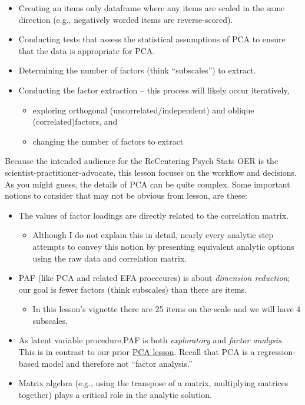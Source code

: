 \documentclass[
  english,
]{book}
\providecommand{\tightlist}{%
  \setlength{\itemsep}{0pt}\setlength{\parskip}{0pt}}
\begin{document}
\begin{itemize}
\tightlist
\item
  Creating an items only dataframe where any items are scaled in the same direction (e.g., negatively worded items are reverse-scored).
\item
  Conducting tests that assess the statistical assumptions of PCA to ensure that the data is appropriate for PCA.
\item
  Determining the number of factors (think ``subscales'') to extract.
\item
  Conducting the factor extraction -- this process will likely occur iteratively,

  \begin{itemize}
  \tightlist
  \item
    exploring orthogonal (uncorrelated/independent) and oblique (correlated)factors, and
  \item
    changing the number of factors to extract
  \end{itemize}
\end{itemize}

Because the intended audience for the ReCentering Psych Stats OER is the scientist-practitioner-advocate, this lesson focuses on the workflow and decisions. As you might guess, the details of PCA can be quite complex. Some important notions to consider that may not be obvious from lesson, are these:

\begin{itemize}
\tightlist
\item
  The values of factor loadings are directly related to the correlation matrix.

  \begin{itemize}
  \tightlist
  \item
    Although I do not explain this in detail, nearly every analytic step attempts to convey this notion by presenting equivalent analytic options using the raw data and correlation matrix.
  \end{itemize}
\item
  PAF (like PCA and related EFA procecures) is about \emph{dimension reduction}; our goal is fewer factors (think subscales) than there are items.

  \begin{itemize}
  \tightlist
  \item
    In this lesson's vignette there are 25 items on the scale and we will have 4 subscales.
  \end{itemize}
\item
  As latent variable procedure,PAF is both \emph{exploratory} and \emph{factor analysis.} This is in contrast to our prior \protect\hyperlink{PCA}{PCA lesson}. Recall that PCA is a regression-based model and therefore not ``factor analysis.''
\item
  Matrix algebra (e.g., using the transpose of a matrix, multiplying matrices together) plays a critical role in the analytic solution.
\end{itemize}
\end{document}
